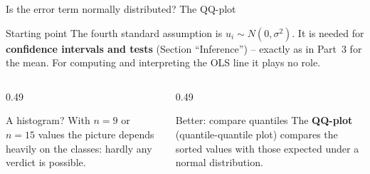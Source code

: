 \documentclass[aspectratio=169,11pt]{beamer}
\begin{document}
\begin{frame}{Is the error term normally distributed? The QQ-plot}
  \begin{block}{Starting point}
    The fourth standard assumption is $u_i \sim N(0,\sigma^{2})$. It is needed
    for \textbf{confidence intervals and tests} (Section ``Inference'') --
    exactly as in Part~3 for the mean. For computing and interpreting the
    OLS line it plays no role.
  \end{block}


  \begin{columns}[T]
    \begin{column}{0.49\textwidth}
      \begin{alertblock}{A histogram?}
        With $n = 9$ or $n = 15$ values the picture depends heavily on the
        classes: hardly any verdict is possible.
      \end{alertblock}
    \end{column}
    \begin{column}{0.49\textwidth}
      \begin{exampleblock}{Better: compare quantiles}
        The \textbf{QQ-plot} (quantile-quantile plot) compares the sorted
        values with those expected under a normal distribution.
      \end{exampleblock}
    \end{column}
  \end{columns}
\end{frame}
\end{document}
